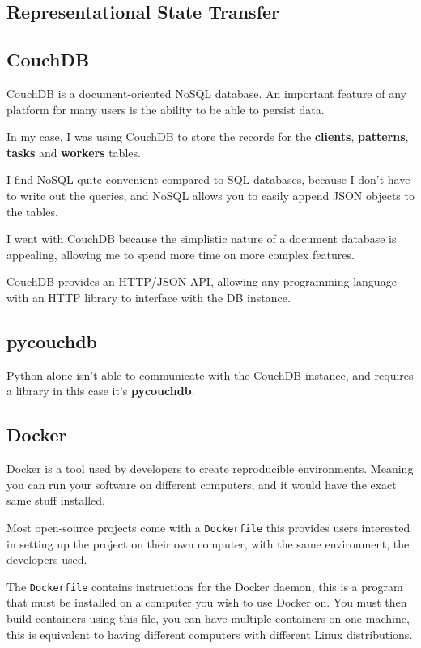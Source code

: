 \subsection{Representational State Transfer}

\subsection{CouchDB}
CouchDB is a document-oriented NoSQL database.
An important feature of any platform for many users is the
ability to be able to persist data.

In my case, I was using CouchDB to store the records for the
\textbf{clients}, \textbf{patterns}, \textbf{tasks} and \textbf{workers} tables.

I find NoSQL quite convenient compared to SQL databases,
because I don't have to write out the queries,
and NoSQL allows you to easily append JSON objects to the tables.

I went with CouchDB because the simplistic nature of a document database is appealing,
allowing me to spend more time on more complex features.

CouchDB provides an HTTP/JSON API, allowing any programming language
with an HTTP library to interface with the DB instance.

\subsection{pycouchdb}
Python alone isn't able to communicate with the CouchDB instance,
and requires a library in this case it's \textbf{pycouchdb}.

\subsection{Docker}
Docker is a tool used by developers to create reproducible environments.
Meaning you can run your software on different computers,
and it would have the exact same stuff installed.

Most open-source projects come with a \texttt{Dockerfile} this provides
users interested in setting up the project on their own computer,
with the same environment, the developers used.

The \texttt{Dockerfile} contains instructions for the Docker daemon,
this is a program that must be installed on a computer you wish to use Docker on.
You must then build containers using this file,
you can have multiple containers on one machine,
this is equivalent to having different computers with different Linux distributions.

